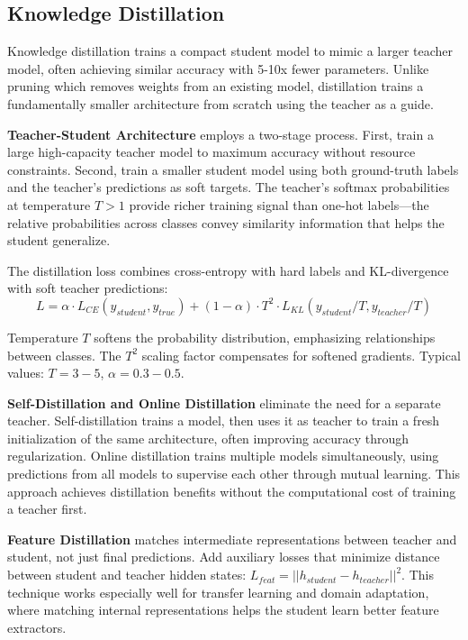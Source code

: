\subsection{Knowledge Distillation}

Knowledge distillation trains a compact student model to mimic a larger teacher model, often achieving similar accuracy with 5-10x fewer parameters. Unlike pruning which removes weights from an existing model, distillation trains a fundamentally smaller architecture from scratch using the teacher as a guide.

\textbf{Teacher-Student Architecture} employs a two-stage process. First, train a large high-capacity teacher model to maximum accuracy without resource constraints. Second, train a smaller student model using both ground-truth labels and the teacher's predictions as soft targets. The teacher's softmax probabilities at temperature $T>1$ provide richer training signal than one-hot labels---the relative probabilities across classes convey similarity information that helps the student generalize.

The distillation loss combines cross-entropy with hard labels and KL-divergence with soft teacher predictions:
$$L = \alpha \cdot L_{CE}(y_{student}, y_{true}) + (1-\alpha) \cdot T^2 \cdot L_{KL}(y_{student}/T, y_{teacher}/T)$$

Temperature $T$ softens the probability distribution, emphasizing relationships between classes. The $T^2$ scaling factor compensates for softened gradients. Typical values: $T=3-5$, $\alpha=0.3-0.5$.

\textbf{Self-Distillation and Online Distillation} eliminate the need for a separate teacher. Self-distillation trains a model, then uses it as teacher to train a fresh initialization of the same architecture, often improving accuracy through regularization. Online distillation trains multiple models simultaneously, using predictions from all models to supervise each other through mutual learning. This approach achieves distillation benefits without the computational cost of training a teacher first.

\textbf{Feature Distillation} matches intermediate representations between teacher and student, not just final predictions. Add auxiliary losses that minimize distance between student and teacher hidden states: $L_{feat} = ||h_{student} - h_{teacher}||^2$. This technique works especially well for transfer learning and domain adaptation, where matching internal representations helps the student learn better feature extractors.

